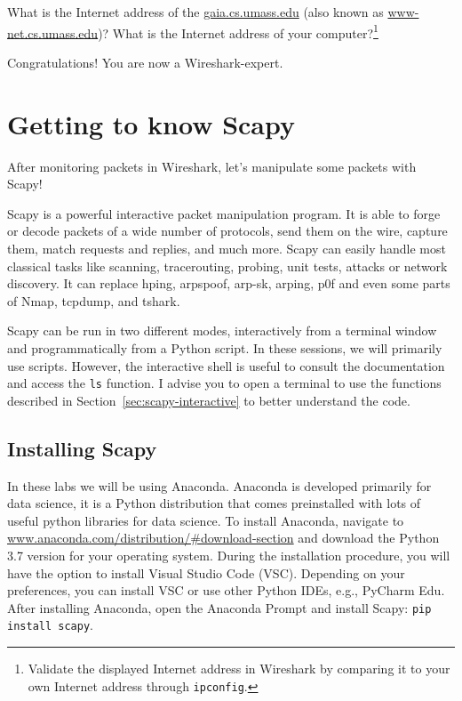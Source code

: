 \documentclass[11pt,a4paper]{article}
\begin{document}
\begin{question}
    What is the Internet address of the \url{gaia.cs.umass.edu} (also known as \url{www-net.cs.umass.edu})? What is the Internet address of your computer?\footnote{Validate the displayed Internet address in Wireshark by comparing it to your own Internet address through \texttt{ipconfig}.}
\end{question}

Congratulations! You are now a Wireshark-expert.

\FloatBarrier
\section{Getting to know Scapy}
After monitoring packets in Wireshark, let's manipulate some packets with Scapy!

Scapy is a powerful interactive packet manipulation program. It is able to forge or decode packets of a wide number of protocols, send them on the wire, capture them, match requests and replies, and much more. Scapy can easily handle most classical tasks like scanning, tracerouting, probing, unit tests, attacks or network discovery. It can replace hping, arpspoof, arp-sk, arping, p0f and even some parts of Nmap, tcpdump, and tshark.

Scapy can be run in two different modes, interactively from a terminal window and programmatically from a Python script. 
In these sessions, we will primarily use scripts. However, the interactive shell is useful to consult the documentation and  access the \texttt{ls} function. I advise you to open a terminal to use the functions described in Section~\ref{sec:scapy-interactive} to better understand the code.


\subsection{Installing Scapy}
In these labs we will be using Anaconda. Anaconda is developed primarily for data science, it is a Python distribution that comes preinstalled with lots of useful python libraries for data science. To install Anaconda, navigate to \url{www.anaconda.com/distribution/#download-section} and download the Python 3.7 version for your operating system. During the installation procedure, you will have the option to install Visual Studio Code (VSC). Depending on your preferences, you can install VSC or use other Python IDEs, e.g., PyCharm Edu. After installing Anaconda, open the Anaconda Prompt and install Scapy: \texttt{pip install scapy}.
\end{document}
